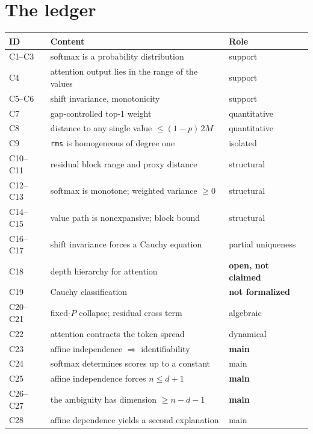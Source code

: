 \documentclass[11pt]{article}
\newcommand{\code}[1]{\texttt{#1}}
\begin{document}
\appendix

\section{The ledger}\label{app:ledger}

\begin{center}
\begin{tabular}{@{}lll@{}}
\toprule
ID & Content & Role \\
\midrule
C1--C3 & softmax is a probability distribution & support \\
C4 & attention output lies in the range of the values & support \\
C5--C6 & shift invariance, monotonicity & support \\
C7 & gap-controlled top-1 weight & quantitative \\
C8 & distance to any single value $\le (1-p)\,2M$ & quantitative \\
C9 & \code{rms} is homogeneous of degree one & isolated \\
C10--C11 & residual block range and proxy distance & structural \\
C12--C13 & softmax is monotone; weighted variance $\ge 0$ & structural \\
C14--C15 & value path is nonexpansive; block bound & structural \\
C16--C17 & shift invariance forces a Cauchy equation & partial uniqueness \\
C18 & depth hierarchy for attention & \textbf{open, not claimed} \\
C19 & Cauchy classification & \textbf{not formalized} \\
C20--C21 & fixed-$P$ collapse; residual cross term & algebraic \\
C22 & attention contracts the token spread & dynamical \\
C23 & affine independence $\Rightarrow$ identifiability & \textbf{main} \\
C24 & softmax determines scores up to a constant & main \\
C25 & affine independence forces $n \le d+1$ & \textbf{main} \\
C26--C27 & the ambiguity has dimension $\ge n-d-1$ & \textbf{main} \\
C28 & affine dependence yields a second explanation & main \\
\bottomrule
\end{tabular}
\end{center}
\end{document}
